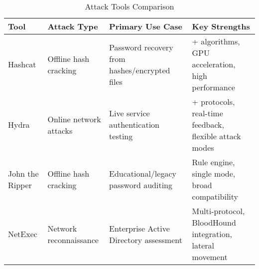 \begin{table}[h!]
\centering
\footnotesize
\begin{tabularx}{\textwidth}{|>{\raggedright\arraybackslash}X|>{\raggedright\arraybackslash}X|>{\raggedright\arraybackslash}X|>{\raggedright\arraybackslash}X|}
\hline
\textbf{Tool} & \textbf{Attack Type} & \textbf{Primary Use Case} & \textbf{Key Strengths} \\
\hline
Hashcat & Offline hash cracking & Password recovery from hashes/encrypted files & 450+ algorithms, GPU acceleration, high performance \\
\hline
Hydra & Online network attacks & Live service authentication testing & 50+ protocols, real-time feedback, flexible attack modes \\
\hline
John the Ripper & Offline hash cracking & Educational/legacy password auditing & Rule engine, single mode, broad compatibility \\
\hline
NetExec & Network reconnaissance & Enterprise Active Directory assessment & Multi-protocol, BloodHound integration, lateral movement \\
\hline
\end{tabularx}
\caption{Attack Tools Comparison}
\label{tab:envtools}
\end{table}
